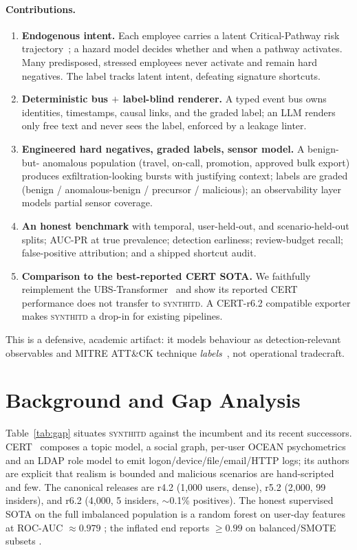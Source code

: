\documentclass[11pt]{article}
\newcommand{\sys}{\textsc{synthitd}}
\begin{document}
\paragraph{Contributions.}
\begin{enumerate}
  \item \textbf{Endogenous intent.} Each employee carries a latent Critical-Pathway
  risk trajectory~\citep{shaw2015critical,sofit2018}; a hazard model decides whether
  and when a pathway activates. Many predisposed, stressed employees never activate and
  remain hard negatives. The label tracks latent intent, defeating signature shortcuts.
  \item \textbf{Deterministic bus $+$ label-blind renderer.} A typed event bus owns
  identities, timestamps, causal links, and the graded label; an LLM renders only free
  text and never sees the label, enforced by a leakage linter.
  \item \textbf{Engineered hard negatives, graded labels, sensor model.} A benign-but-
  anomalous population (travel, on-call, promotion, approved bulk export) produces
  exfiltration-looking bursts with justifying context; labels are graded
  (benign / anomalous-benign / precursor / malicious); an observability layer models
  partial sensor coverage.
  \item \textbf{An honest benchmark} with temporal, user-held-out, and
  scenario-held-out splits; AUC-PR at true prevalence; detection earliness;
  review-budget recall; false-positive attribution; and a shipped shortcut audit.
  \item \textbf{Comparison to the best-reported CERT SOTA.} We faithfully reimplement
  the UBS-Transformer~\citep{ubstransformer2025} and show its reported CERT performance
  does not transfer to \sys. A CERT-r6.2 compatible exporter makes \sys{} a drop-in for
  existing pipelines.
\end{enumerate}

This is a defensive, academic artifact: it models behaviour as detection-relevant
observables and MITRE ATT\&CK technique \emph{labels}~\citep{ctid2022insider}, not
operational tradecraft.

\section{Background and Gap Analysis}
\label{sec:gap}
Table~\ref{tab:gap} situates \sys{} against the incumbent and its recent successors.
CERT~\citep{glasser2013bridging} composes a topic model, a social graph, per-user
OCEAN psychometrics and an LDAP role model to emit logon/device/file/email/HTTP logs;
its authors are explicit that realism is bounded and malicious scenarios are
hand-scripted and few. The canonical releases are r4.2 (1{,}000 users, dense), r5.2
(2{,}000, 99 insiders), and r6.2 (4{,}000, 5 insiders, $\sim$0.1\% positives). The
honest supervised SOTA on the full imbalanced population is a random forest on
user-day features at ROC-AUC $\approx 0.979$ \citep{le2020granularity}; the inflated
end reports $\geq 0.99$ on balanced/SMOTE subsets \citep{sivakrishna2025xgboost}.
\end{document}
